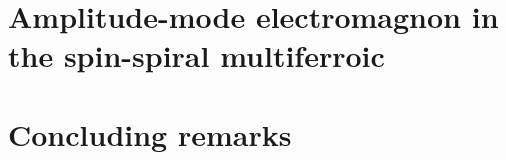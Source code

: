 \documentclass[
    letterpaper,
    12pt,
    openbib,
]{memoir}
\begin{document}
\frontmatter*


\acknowledgements

\clearpage

\tableofcontents
\clearpage
\listoffigures
\clearpage
\listoftables
\clearpage

\mainmatter*
% 
% 
% 
% 
% 
% 
\chapter{Amplitude-mode electromagnon in the spin-spiral multiferroic }\label{ch:cubr2}

\chapter{Concluding remarks}\label{ch:conclusion}

\backmatter*

\end{document}
